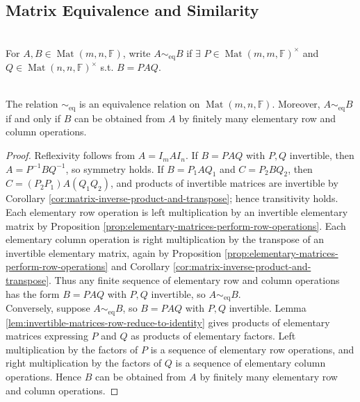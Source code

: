 \subsection{Matrix Equivalence and Similarity}
\begin{definition} \label{def:matrix-equivalence} \\
For $A,B\in\operatorname{Mat}(m,n,\mathbb{F})$, write $A\sim_{\mathrm{eq}} B$ if $\exists$ $P\in\operatorname{Mat}(m,m,\mathbb{F})^{\times}$ and $Q\in\operatorname{Mat}(n,n,\mathbb{F})^{\times}$ s.t. $B=PAQ$.
\end{definition}

\begin{proposition} \label{prop:matrix-equivalence-basic-properties} \\
The relation $\sim_{\mathrm{eq}}$ is an equivalence relation on $\operatorname{Mat}(m,n,\mathbb{F})$. Moreover, $A\sim_{\mathrm{eq}}B$ if and only if $B$ can be obtained from $A$ by finitely many elementary row and column operations.
\begin{proof}
Reflexivity follows from $A=I_mAI_n$. If $B=PAQ$ with $P,Q$ invertible, then $A=P^{-1}BQ^{-1}$, so symmetry holds. If $B=P_1AQ_1$ and $C=P_2BQ_2$, then $C=(P_2P_1)A(Q_1Q_2)$, and products of invertible matrices are invertible by Corollary \ref{cor:matrix-inverse-product-and-transpose}; hence transitivity holds.\\
Each elementary row operation is left multiplication by an invertible elementary matrix by Proposition \ref{prop:elementary-matrices-perform-row-operations}. Each elementary column operation is right multiplication by the transpose of an invertible elementary matrix, again by Proposition \ref{prop:elementary-matrices-perform-row-operations} and Corollary \ref{cor:matrix-inverse-product-and-transpose}. Thus any finite sequence of elementary row and column operations has the form $B=PAQ$ with $P,Q$ invertible, so $A\sim_{\mathrm{eq}}B$.\\
Conversely, suppose $A\sim_{\mathrm{eq}}B$, so $B=PAQ$ with $P,Q$ invertible. Lemma \ref{lem:invertible-matrices-row-reduce-to-identity} gives products of elementary matrices expressing $P$ and $Q$ as products of elementary factors. Left multiplication by the factors of $P$ is a sequence of elementary row operations, and right multiplication by the factors of $Q$ is a sequence of elementary column operations. Hence $B$ can be obtained from $A$ by finitely many elementary row and column operations.
\end{proof}
\end{proposition}

